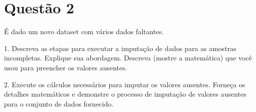 \section*{Questão 2}

É dado um novo dataset com vários dados faltantes.

1. Descreva as etapas para executar a imputação de dados para as amostras incompletas. Explique sua abordagem. Descreva (mostre a matemática) que você usou para preencher os valores ausentes.

\begin{tcolorbox}[colback=white, colframe=black, title=Resposta:]

\end{tcolorbox}

2. Execute os cálculos necessários para imputar os valores ausentes. Forneça os detalhes matemáticos e demonstre o processo de imputação de valores ausentes para o conjunto de dados fornecido.

\begin{tcolorbox}[colback=white, colframe=black, title=Resposta:]

\end{tcolorbox}
